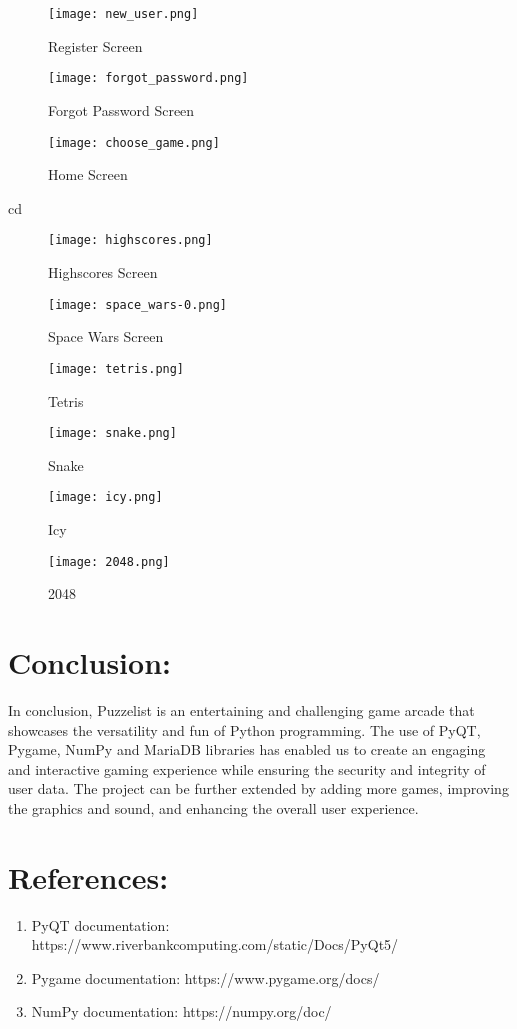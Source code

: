 \documentclass[16pt]{article}
\begin{document}
\begin{figure}[H]
    \centering
    \texttt{[image: new\_user.png]}
    \caption{Register Screen}
\end{figure}

\begin{figure}[H]
    \centering
    \texttt{[image: forgot\_password.png]}
    \caption{Forgot Password Screen}
\end{figure}

\begin{figure}[H]
    \centering
    \texttt{[image: choose\_game.png]}
    \caption{Home Screen}
\end{figure}cd 

\begin{figure}[H]
    \centering
    \texttt{[image: highscores.png]}
    \caption{Highscores Screen}
\end{figure}

\begin{figure}[H]
    \centering
    \texttt{[image: space\_wars-0.png]}
    \caption{Space Wars Screen}
\end{figure}

\begin{figure}[H]
    \centering
    \texttt{[image: tetris.png]}
    \caption{Tetris}
\end{figure}

\begin{figure}[H]
    \centering
    \texttt{[image: snake.png]}
    \caption{Snake}
\end{figure}

\begin{figure}[H]
    \centering
    \texttt{[image: icy.png]}
    \caption{Icy}
\end{figure}

\begin{figure}[H]
    \centering
    \texttt{[image: 2048.png]}
    \caption{2048}
\end{figure}

\section{Conclusion:}
In conclusion, Puzzelist is an entertaining and challenging game arcade that showcases the versatility and fun of Python programming. The use of PyQT, Pygame, NumPy and MariaDB libraries has enabled us to create an engaging and interactive gaming experience while ensuring the security and integrity of user data. The project can be further extended by adding more games, improving the graphics and sound, and enhancing the overall user experience.

\section{References:}
\begin{enumerate}
    \item PyQT documentation: https://www.riverbankcomputing.com/static/Docs/PyQt5/
    \item Pygame documentation: https://www.pygame.org/docs/
    \item NumPy documentation: https://numpy.org/doc/   
\end{enumerate}
\end{document}

